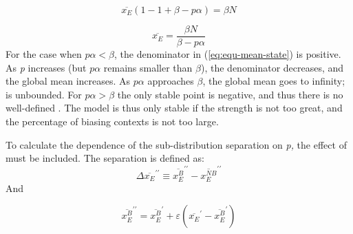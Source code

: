 \begin{equation}
\overline{x_{E}}(1-1+\beta-p\alpha)=\beta N
\end{equation}

\begin{equation}
\overline{x_{E}}=\frac{\beta N}{\beta-p\alpha}\label{eq:equ-mean-state}
\end{equation}
For the case when $p\alpha<\beta$, the denominator in (\ref{eq:equ-mean-state})
is positive. As \emph{p} increases (but $p\alpha$ remains smaller
than $\beta$), the denominator decreases, and the global mean increases.
As $p\alpha$ approaches $\beta$, the global mean goes to infinity;
 is unbounded. For $p\alpha>\beta$ the only stable point
is negative, and thus there is no well-defined . The 
model is thus only stable if the  strength is not too great,
and the percentage of biasing contexts is not too large. 

To calculate the dependence of the sub-distribution separation on
\emph{p,} the effect of  must be included. The 
separation is defined as: 
\begin{equation}
\Delta\overline{x_{E}}^{\prime\prime}\equiv\overline{x_{E}^{B}}^{\prime\prime}-\overline{x_{E}^{NB}}^{\prime\prime}
\end{equation}
And 

\begin{equation}
\overline{x_{E}^{B}}^{\prime\prime}=\overline{x_{E}^{B}}^{\prime}+\varepsilon\left(\overline{x_{E}}^{\prime}-\overline{x_{E}^{B}}^{\prime}\right)
\end{equation}

